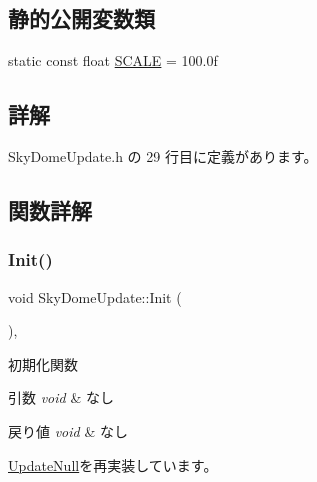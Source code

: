 \subsection*{静的公開変数類}
\begin{DoxyCompactItemize}
\item 
static const float \mbox{\hyperlink{class_sky_dome_update_a4c6750a54880db753cfe2a4ecfd24130}{S\+C\+A\+LE}} = 100.\+0f
\end{DoxyCompactItemize}


\subsection{詳解}


 Sky\+Dome\+Update.\+h の 29 行目に定義があります。



\subsection{関数詳解}
\mbox{\label{class_sky_dome_update_ab4fec6d13590c07e39e6e8b4f7f7613a}} 
\subsubsection{\texorpdfstring{Init()}{Init()}}
{\footnotesize\ttfamily void Sky\+Dome\+Update\+::\+Init (\begin{DoxyParamCaption}{ }\end{DoxyParamCaption})\hspace{0.3cm}{\ttfamily [override]}, {\ttfamily [virtual]}}



初期化関数 


\begin{DoxyParams}{引数}
{\em void} & なし \\
\hline
\end{DoxyParams}

\begin{DoxyRetVals}{戻り値}
{\em void} & なし \\
\hline
\end{DoxyRetVals}


\mbox{\hyperlink{class_update_null_abe9bc57c7932d2de47073c2709007432}{Update\+Null}}を再実装しています。




